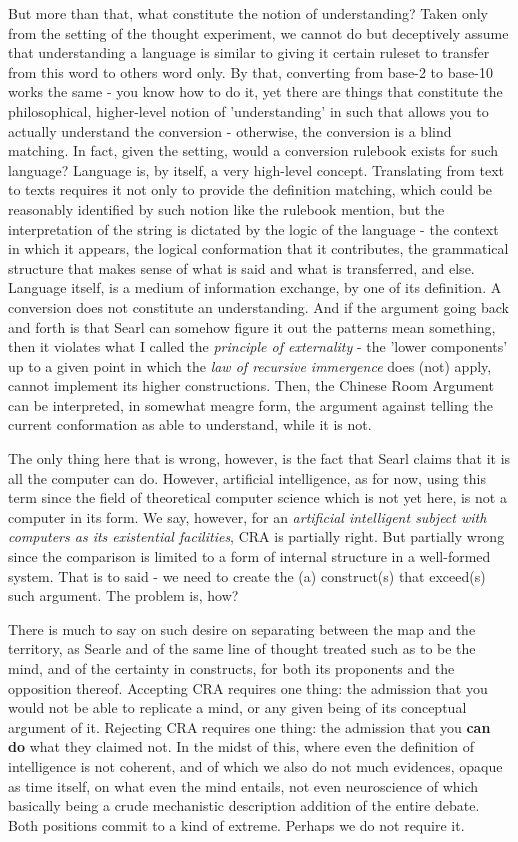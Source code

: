 But more than that, what constitute the notion of understanding? Taken only from the setting of the thought experiment, we cannot do but deceptively assume that understanding a language is similar to giving it certain ruleset to transfer from this word to others word only. By that, converting from base-2 to base-10 works the same - you know how to do it, yet there are things that constitute the philosophical, higher-level notion of 'understanding' in such that allows you to actually understand the conversion - otherwise, the conversion is a blind matching. In fact, given the setting, would a conversion rulebook exists for such language? Language is, by itself, a very high-level concept. Translating from text to texts requires it not only to provide the definition matching, which could be reasonably identified by such notion like the rulebook mention, but the interpretation of the string is dictated by the logic of the language - the context in which it appears, the logical conformation that it contributes, the grammatical structure that makes sense of what is said and what is transferred, and else. Language itself, is a medium of information exchange, by one of its definition. A conversion does not constitute an understanding. And if the argument going back and forth is that Searl can somehow figure it out the patterns mean something, then it violates what I called the \textit{principle of externality} - the 'lower components' up to a given point in which the \textit{law of recursive immergence} does (not) apply, cannot implement its higher constructions. Then, the Chinese Room Argument can be interpreted, in somewhat meagre form, the argument against telling the current conformation as able to understand, while it is not.

The only thing here that is wrong, however, is the fact that Searl claims that it is all the computer can do. However, artificial intelligence, as for now, using this term since the field of theoretical computer science which is not yet here, is not a computer in its form. We say, however, for an \textit{artificial intelligent subject with computers as its existential facilities}, CRA is partially right. But partially wrong since the comparison is limited to a form of internal structure in a well-formed system. That is to said - we need to create the (a) construct(s) that exceed(s) such argument. The problem is, how?

There is much to say on such desire on separating between the map and the territory, as Searle and of the same line of thought treated such as to be the mind, and of the certainty in constructs, for both its proponents and the opposition thereof. Accepting CRA requires one thing: the admission that you would not be able to replicate a mind, or any given being of its conceptual argument of it. Rejecting CRA requires one thing: the admission that you \textbf{can do} what they claimed not. In the midst of this, where even the definition of intelligence is not coherent, and of which we also do not much evidences, opaque as time itself, on what even the mind entails, not even neuroscience of which basically being a crude mechanistic description addition of the entire debate. Both positions commit to a kind of extreme. Perhaps we do not require it. 

